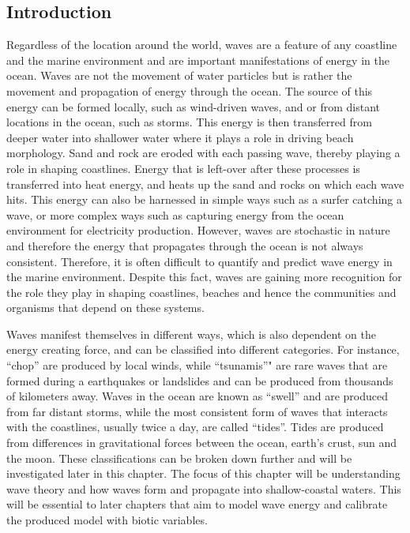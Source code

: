 \documentclass[]{article}
\begin{document}
\hypertarget{introduction}{%
\subsection{Introduction}\label{introduction}}

Regardless of the location around the world, waves are a feature of any
coastline and the marine environment and are important manifestations of
energy in the ocean. Waves are not the movement of water particles but
is rather the movement and propagation of energy through the ocean. The
source of this energy can be formed locally, such as wind-driven waves,
and or from distant locations in the ocean, such as storms. This energy
is then transferred from deeper water into shallower water where it
plays a role in driving beach morphology. Sand and rock are eroded with
each passing wave, thereby playing a role in shaping coastlines. Energy
that is left-over after these processes is transferred into heat energy,
and heats up the sand and rocks on which each wave hits. This energy can
also be harnessed in simple ways such as a surfer catching a wave, or
more complex ways such as capturing energy from the ocean environment
for electricity production. However, waves are stochastic in nature and
therefore the energy that propagates through the ocean is not always
consistent. Therefore, it is often difficult to quantify and predict
wave energy in the marine environment. Despite this fact, waves are
gaining more recognition for the role they play in shaping coastlines,
beaches and hence the communities and organisms that depend on these
systems.

Waves manifest themselves in different ways, which is also dependent on
the energy creating force, and can be classified into different
categories. For instance, ``chop'' are produced by local winds, while
``tsunamis''" are rare waves that are formed during a earthquakes or
landslides and can be produced from thousands of kilometers away. Waves
in the ocean are known as ``swell'' and are produced from far distant
storms, while the most consistent form of waves that interacts with the
coastlines, usually twice a day, are called ``tides''. Tides are
produced from differences in gravitational forces between the ocean,
earth's crust, sun and the moon. These classifications can be broken
down further and will be investigated later in this chapter. The focus
of this chapter will be understanding wave theory and how waves form and
propagate into shallow-coastal waters. This will be essential to later
chapters that aim to model wave energy and calibrate the produced model
with biotic variables.
\end{document}
